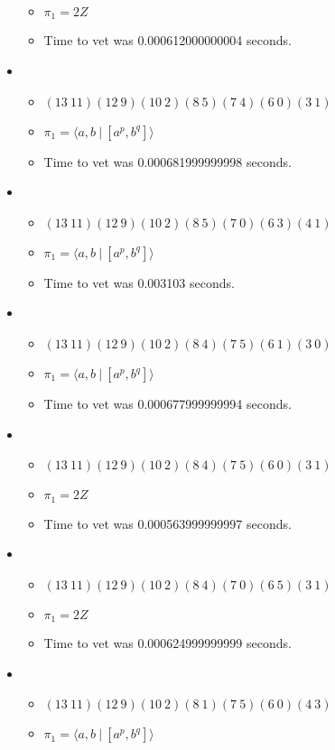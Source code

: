 \documentclass{article}
\begin{document}
\begin{itemize}
\begin{itemize}
      \item $\pi_1 =2 Z$
      \item Time to vet was 0.000612000000004 seconds.
\end{itemize}
\item \begin{itemize}
      \item $(13\ 11)(12\ 9)(10\ 2)(8\ 5)(7\ 4)(6\ 0)(3\ 1)$
      \item $\pi_1 = \langle a,b\ |\ [a^p,b^q]\rangle$
      \item Time to vet was 0.000681999999998 seconds.
\end{itemize}
\item \begin{itemize}
      \item $(13\ 11)(12\ 9)(10\ 2)(8\ 5)(7\ 0)(6\ 3)(4\ 1)$
      \item $\pi_1 = \langle a,b\ |\ [a^p,b^q]\rangle$
      \item Time to vet was 0.003103 seconds.
\end{itemize}
\item \begin{itemize}
      \item $(13\ 11)(12\ 9)(10\ 2)(8\ 4)(7\ 5)(6\ 1)(3\ 0)$
      \item $\pi_1 = \langle a,b\ |\ [a^p,b^q]\rangle$
      \item Time to vet was 0.000677999999994 seconds.
\end{itemize}
\item \begin{itemize}
      \item $(13\ 11)(12\ 9)(10\ 2)(8\ 4)(7\ 5)(6\ 0)(3\ 1)$
      \item $\pi_1 =2 Z$
      \item Time to vet was 0.000563999999997 seconds.
\end{itemize}
\item \begin{itemize}
      \item $(13\ 11)(12\ 9)(10\ 2)(8\ 4)(7\ 0)(6\ 5)(3\ 1)$
      \item $\pi_1 =2 Z$
      \item Time to vet was 0.000624999999999 seconds.
\end{itemize}
\item \begin{itemize}
      \item $(13\ 11)(12\ 9)(10\ 2)(8\ 1)(7\ 5)(6\ 0)(4\ 3)$
      \item $\pi_1 = \langle a,b\ |\ [a^p,b^q]\rangle$

\end{itemize}
\end{itemize}
\end{document}
